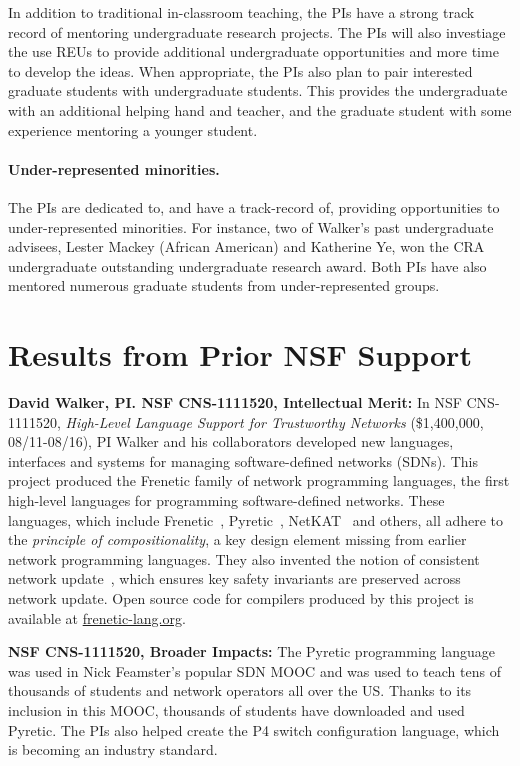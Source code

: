 In addition to traditional in-classroom teaching, the PIs have a strong 
track record of mentoring
undergraduate research projects.
The PIs will also
investiage the use REUs to provide additional undergraduate opportunities
and more time to develop the ideas.
When appropriate, 
the PIs also plan to pair interested graduate students with undergraduate 
students.  This provides the undergraduate with
an additional helping hand and teacher, and the graduate student with
some experience mentoring a younger student.  

\paragraph*{Under-represented minorities.} The PIs are dedicated
to, and have a track-record of, providing opportunities to under-represented 
minorities.  For instance, two of Walker's past undergraduate advisees,
Lester Mackey (African American) and Katherine Ye, won the CRA undergraduate 
outstanding undergraduate
research award.  Both PIs have also mentored numerous graduate students from 
under-represented groups.

\section{Results from Prior NSF Support}
\label{sec:prior-support}

\noindent
{\bf David Walker, PI. NSF CNS-1111520, Intellectual Merit:}
In NSF CNS-1111520, \emph{High-Level Language Support for Trustworthy Networks}
(\$1,400,000, 08/11-08/16),
PI Walker and his collaborators developed new languages, interfaces
and systems for managing software-defined networks (SDNs).  
This project produced the Frenetic family
of network programming languages, the first high-level languages for
programming software-defined networks.  These languages, which include
Frenetic~\cite{frenetic}, 
Pyretic~\cite{pyretic},
NetKAT~\cite{netkat} and others, all adhere to the
\emph{principle of compositionality}, a key design element missing
from earlier network programming languages.  They also invented the
notion of consistent network update~\cite{reitblatt+:consistent-updates},
which ensures key safety invariants are preserved across network update.
Open source code for compilers produced by this project is available
at \url{frenetic-lang.org}.

\noindent
{\bf NSF CNS-1111520, Broader Impacts:} 
The Pyretic programming language was used in Nick Feamster's popular
SDN MOOC and was used to teach tens of thousands of students and
network operators all over the US.  Thanks to its inclusion in this
MOOC, thousands of students have downloaded and used Pyretic.  The PIs
also helped create the P4 switch configuration language, which is
becoming an industry standard.


